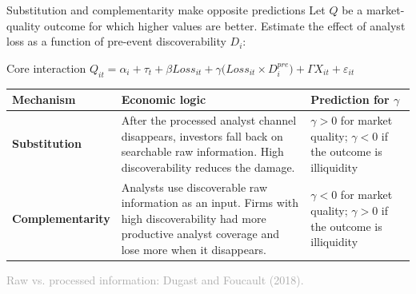 \documentclass[aspectratio=169,10pt]{beamer}
\newcommand{\source}[1]{\vfill{\scriptsize\textcolor{DarkGray}{#1}}}
\begin{document}
\begin{frame}[t]{Substitution and complementarity make opposite predictions}
\small
Let $Q$ be a market-quality outcome for which higher values are better. Estimate the effect of analyst loss as a function of pre-event discoverability $D_i$:

\begin{block}{Core interaction}
\centering
$Q_{it}=\alpha_i+\tau_t+\beta Loss_{it}
+\gamma\bigl(Loss_{it}\times D_i^{pre}\bigr)+\Gamma X_{it}+\varepsilon_{it}$
\end{block}

\scriptsize
\renewcommand{\arraystretch}{1.12}
\begin{tabularx}{\textwidth}{>{\bfseries\RaggedRight\arraybackslash}p{2.80cm} >{\RaggedRight\arraybackslash}X >{\RaggedRight\arraybackslash}X}
\toprule
Mechanism & Economic logic & Prediction for $\gamma$ \\
\midrule
Substitution & After the processed analyst channel disappears, investors fall back on searchable raw information. High discoverability reduces the damage. & $\gamma>0$ for market quality; $\gamma<0$ if the outcome is illiquidity \\
Complementarity & Analysts use discoverable raw information as an input. Firms with high discoverability had more productive analyst coverage and lose more when it disappears. & $\gamma<0$ for market quality; $\gamma>0$ if the outcome is illiquidity \\
\bottomrule
\end{tabularx}

\source{Raw vs. processed information: Dugast and Foucault (2018).}
\end{frame}
\end{document}
